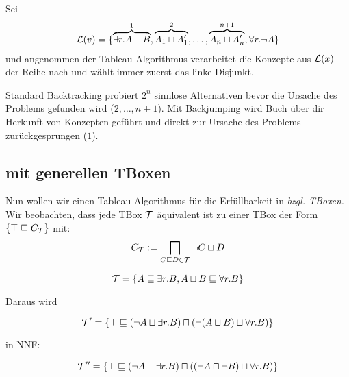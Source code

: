 \begin{tafel}
    Sei 
    \begin{align*}
    \mathcal{L}(v) = \{\overbrace{\exists r.A \sqcup B}^1, \overbrace{A_1 \sqcup A_1'}^2, \ldots, \overbrace{A_n \sqcup A_n'}^{n + 1}, \forall r.\neg A\}
    \end{align*}
    und angenommen der Tableau-Algorithmus verarbeitet die Konzepte aus $\mathcal{L}(x)$ der Reihe nach und wählt immer zuerst das linke Disjunkt.
    \begin{center}
    \end{center}
    Standard Backtracking probiert $2^n$ sinnlose Alternativen bevor die Ursache des Problems gefunden wird ($2, \ldots, n + 1$). Mit Backjumping wird Buch über dir Herkunft von Konzepten geführt und direkt zur Ursache des Problems zurückgesprungen ($1$).
\end{tafel}

\subsection{\texorpdfstring{\ALC}{ALC} mit generellen TBoxen}\label{alc-mit-generellen-tboxen}

Nun wollen wir einen Tableau-Algorithmus für die Erfüllbarkeit in \ALC  \emph{bzgl. TBoxen}. Wir beobachten, dass jede TBox $\mathcal{T}$ äquivalent ist zu einer TBox der Form
$\left\{ \top \sqsubseteq C_{\MT} \right\}$ mit: 
\begin{align*}
C_{\mathcal{T}} := \bigsqcap_{C \sqsubseteq D \in \mathcal{T}}\neg C \sqcup D
\end{align*}

\begin{tafel}

$$\mathcal{T} = \{A \sqsubseteq \exists r.B, A \sqcup B \sqsubseteq \forall r.B\}$$

Daraus wird

$$\mathcal{T}' = \{\top \sqsubseteq (\neg A \sqcup \exists r.B) \sqcap (\neg (A \sqcup B) \sqcup \forall r.B)\}$$

in NNF:

$$\mathcal{T}'' = \{\top \sqsubseteq (\neg A \sqcup \exists r.B) \sqcap ((\neg A \sqcap \neg B) \sqcup \forall r.B)\}$$
\end{tafel}

